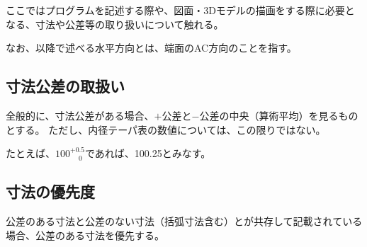 

ここではプログラムを記述する際や、図面・3Dモデルの描画をする際に必要となる、寸法や公差等の取り扱いについて触れる。

なお、以降で述べる水平方向とは、端面のAC方向のことを指す。





\subsection{寸法公差の取扱い}
全般的に、寸法公差がある場合、$+$公差と$-$公差の中央（算術平均）を見るものとする。
ただし、内径テーパ表の数値については、この限りではない。
\begin{hosoku}
たとえば、$100^{+0.5}_{\phantom -0}$であれば、100.25とみなす。
\end{hosoku}


\subsection{寸法の優先度}
公差のある寸法と公差のない寸法（括弧寸法含む）とが共存して記載されている場合、公差のある寸法を優先する。

